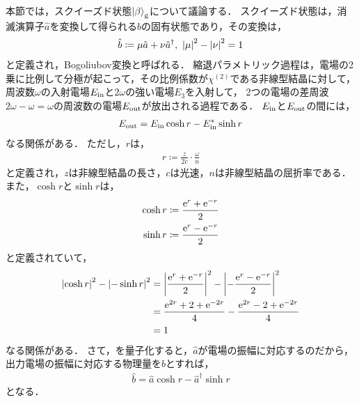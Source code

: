 \documentclass{report}
\begin{document}
  本節では，スクイーズド状態$\ket{\beta}_{\mathrm{g}}$について議論する．
  スクイーズド状態は，消滅演算子$\hat{a}$を変換して得られる$\hat{b}$の固有状態であり，その変換は，
  \begin{align}
    \hat{b} \coloneqq \mu\hat{a} + \nu\hat{a}^{\dag},\ \abs{\mu}^2 - \abs{\nu}^2 = 1
  \end{align}
  と定義され，Bogoliubov変換と呼ばれる．
  縮退パラメトリック過程は，電場の2乗に比例して分極が起こって，その比例係数が$\chi^{(2)}$である非線型結晶に対して，
  周波数$\omega$の入射電場$E_{\mathrm{in}}$と$2\omega$の強い電場$E_3$を入射して，
  2つの電場の差周波$2\omega - \omega = \omega$の周波数の電場$E_{\mathrm{out}}$が放出される過程である．
  $E_{\mathrm{in}}$と$E_{\mathrm{out}}$の間には，
  \begin{align}
    E_{\mathrm{out}} = E_{\mathrm{in}}\cosh r - E_{\mathrm{in}}^*\sinh r \label{spdc-classical}
  \end{align}
  なる関係がある．
  ただし，$r$は，
  \begin{align}
    r \coloneqq \frac{z}{2c}\cdot\frac{\omega}{n}
  \end{align}
  と定義され，$z$は非線型結晶の長さ，$c$は光速，$n$は非線型結晶の屈折率である．
  また，$\cosh r$と$\sinh r$は，
  \begin{align}
    \cosh r &\coloneqq \frac{\mathrm{e}^r + \mathrm{e}^{-r}}{2} \\ 
    \sinh r &\coloneqq \frac{\mathrm{e}^r - \mathrm{e}^{-r}}{2} \\ 
  \end{align}
  と定義されていて，
  \begin{align}
    \abs{\cosh r}^2 - \abs{-\sinh r}^2 &= \abs{\frac{\mathrm{e}^r + \mathrm{e}^{-r}}{2}}^2 - \abs{-\frac{\mathrm{e}^r - \mathrm{e}^{-r}}{2}}^2 \\ 
    &= \frac{\mathrm{e}^{2r} + 2 + \mathrm{e}^{-2r}}{4} - \frac{\mathrm{e}^{2r} - 2 + \mathrm{e}^{-2r}}{4} \\ 
    &= 1 \label{cosh-sinh-relation}
  \end{align}
  なる関係がある．
  さて，を量子化すると，$\hat{a}$が電場の振幅に対応するのだから，
  出力電場の振幅に対応する物理量を$\hat{b}$とすれば，
  \begin{align}
    \hat{b} = \hat{a}\cosh r - \hat{a}^{\dag}\sinh r
  \end{align}
  となる．
\end{document}
